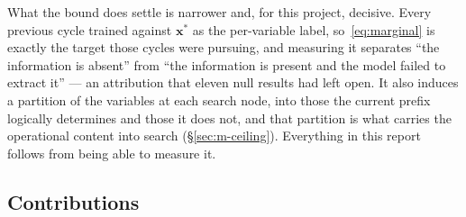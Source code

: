 \documentclass[12pt]{article}
\begin{document}
What the bound does settle is narrower and, for this project, decisive. Every previous cycle trained against $\mathbf{x}^\ast$ as the per-variable label, so~\eqref{eq:marginal} is exactly the target those cycles were pursuing, and measuring it separates ``the information is absent'' from ``the information is present and the model failed to extract it'' --- an attribution that eleven null results had left open. It also induces a partition of the variables at each search node, into those the current prefix logically determines and those it does not, and that partition is what carries the operational content into search (\S\ref{sec:m-ceiling}). Everything in this report follows from being able to measure it.

\subsection{Contributions}
\end{document}
